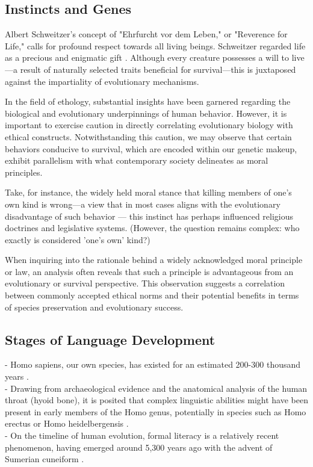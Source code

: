 \documentclass[12pt,a4]{article}
\begin{document}
    \subsection{Instincts and Genes}
Albert Schweitzer's concept of "Ehrfurcht vor dem Leben," or "Reverence for Life," calls for profound respect towards all living beings. Schweitzer regarded life as a precious and enigmatic gift \cite{Schweitzer}. Although every creature possesses a will to live—a result of naturally selected traits beneficial for survival—this is juxtaposed against the impartiality of evolutionary mechanisms.
\par 
In the field of ethology, substantial insights have been garnered regarding the biological and evolutionary underpinnings of human behavior. However, it is important to exercise caution in directly correlating evolutionary biology with ethical constructs. Notwithstanding this caution, we may observe that certain behaviors conducive to survival, which are encoded within our genetic makeup, exhibit parallelism with what contemporary society delineates as moral principles.

\par Take, for instance, the widely held moral stance that killing members of one's own kind is wrong—a view that in most cases aligns with the evolutionary disadvantage of such behavior — this instinct has perhaps influenced religious doctrines and legislative systems. 
(However, the question remains complex: who exactly is considered 'one's own' kind?)
\par
When inquiring into the rationale behind a widely acknowledged moral principle or law, an analysis often reveals that such a principle is advantageous from an evolutionary or survival perspective. This observation suggests a correlation between commonly accepted ethical norms and their potential benefits in terms of species preservation and evolutionary success.


    \subsection{Stages of Language Development}

- Homo sapiens, our own species, has existed for an estimated 200-300 thousand years \cite{Vidal}. \\
- Drawing from archaeological evidence and the anatomical analysis of the human throat (hyoid bone), it is posited that complex linguistic abilities might have been present in early members of the Homo genus, potentially in species such as Homo erectus or Homo heidelbergensis \cite{Capasso2008AHE}. \\
- On the timeline of human evolution, formal literacy is a relatively recent phenomenon, having emerged around 5,300 years ago with the advent of Sumerian cuneiform \cite{Walker}.
\end{document}
